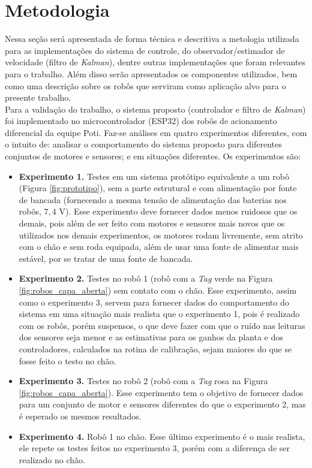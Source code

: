 \chapter[Metodologia]{Metodologia}
\label{ch:metodologia}

Nessa seção será apresentada de forma técnica e descritiva a metologia utilizada para as implementações do sistema de controle, do observador/estimador de velocidade (filtro de \emph{Kalman}), dentre outras implementações que foram relevantes para o trabalho. Além disso serão apresentados os componentes utilizados, bem como uma descrição sobre os robôs que serviram como aplicação alvo para o presente trabalho.\\

Para a validação do trabalho, o sistema proposto (controlador e filtro de \emph{Kalman}) foi implementado no microcontrolador (ESP32) dos robôs de acionamento diferencial da equipe Poti. Faz-se análises em quatro experimentos diferentes, com o intuito de: analisar o comportamento do sistema proposto para diferentes conjuntos de motores e sensores; e em situações diferentes. Os experimentos são:

\begin{itemize}
    \item \textbf{Experimento 1.} Testes em um sistema protótipo equivalente a um robô (Figura \ref{fig:prototipo}), sem a parte estrutural e com alimentação por fonte de bancada (fornecendo a mesma tensão de alimentação das baterias nos robôs, $7,4$ V). Esse experimento deve fornecer dados menos ruidosos que os demais, pois além de ser feito com motores e sensores mais novos que os utilizados nos demais experimentos, os motores rodam livremente, sem atrito com o chão e sem roda equipada, além de usar uma fonte de alimentar mais estável, por se tratar de uma fonte de bancada.
    \item \textbf{Experimento 2.} Testes no robô 1 (robô com a \emph{Tag} verde na Figura \ref{fig:robos_capa_aberta}) sem contato com o chão. Esse experimento, assim como o experimento 3, servem para fornecer dados do comportamento do sistema em uma situação mais realista que o experimento 1, pois é realizado com os robôs, porém suspensos, o que deve fazer com que o ruído nas leituras dos sensores seja menor e as estimativas para os ganhos da planta e dos controladores, calculados na rotina de calibração, sejam maiores do que se fosse feito o testo no chão.
    \item \textbf{Experimento 3.} Testes no robô 2 (robô com a \emph{Tag} rosa na Figura \ref{fig:robos_capa_aberta}). Esse experimento tem o objetivo de fornecer dados para um conjunto de motor e sensores diferentes do que o experimento 2, mas é esperado os mesmos resultados.
    \item \textbf{Experimento 4.} Robô 1 no chão. Esse último experimento é o mais realista, ele repete os testes feitos no experimento 3, porém com a diferença de ser realizado no chão.
\end{itemize}

